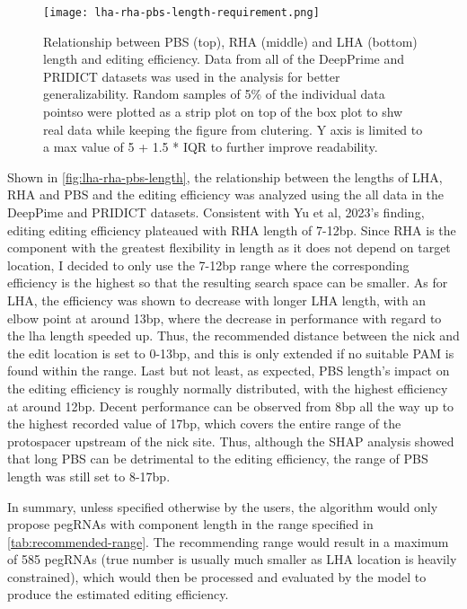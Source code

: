 \begin{figure}
    \texttt{[image: lha-rha-pbs-length-requirement.png]}
    \caption[Relationship between LHA, RHA and PBS length and editing efficiency]{Relationship between PBS (top), RHA (middle) and LHA (bottom) length and editing efficiency. Data from all of the DeepPrime and PRIDICT datasets was used in the analysis for better generalizability. Random samples of 5\% of the individual data pointso were plotted as a strip plot on top of the box plot to shw real data while keeping the figure from clutering. Y axis is limited to a max value of 5 + 1.5 * IQR to further improve readability. }
    \label{fig:lha-rha-pbs-length}
\end{figure}


Shown in \autoref{fig:lha-rha-pbs-length}, the relationship between the lengths of LHA, RHA and PBS and the editing efficiency was analyzed using the all data in the DeepPime and PRIDICT datasets. Consistent with Yu et al, 2023's finding, editing editing efficiency plateaued with RHA length of 7-12bp. Since RHA is the component with the greatest flexibility in length as it does not depend on target location, I decided to only use the 7-12bp range where the corresponding efficiency is the highest so that the resulting search space can be smaller.  As for LHA, the efficiency was shown to decrease with longer LHA length, with an elbow point at around 13bp, where the decrease in performance with regard to the lha length speeded up. Thus, the recommended distance between the nick and the edit location is set to 0-13bp, and this is only extended if no suitable PAM is found within the range. Last but not least, as expected, PBS length's impact on the editing efficiency is roughly normally distributed, with the highest efficiency at around 12bp. Decent performance can be observed from 8bp all the way up to the highest recorded value of 17bp, which covers the entire range of the protospacer upstream of the nick site. Thus, although the SHAP analysis showed that long PBS can be detrimental to the editing efficiency, the range of PBS length was still set to 8-17bp.

In summary, unless specified otherwise by the users, the algorithm would only propose pegRNAs with component length in the range specified in \autoref{tab:recommended-range}. The recommending range would result in a maximum of 585 pegRNAs (true number is usually much smaller as LHA location is heavily constrained), which would then be processed and evaluated by the model to produce the estimated editing efficiency.

